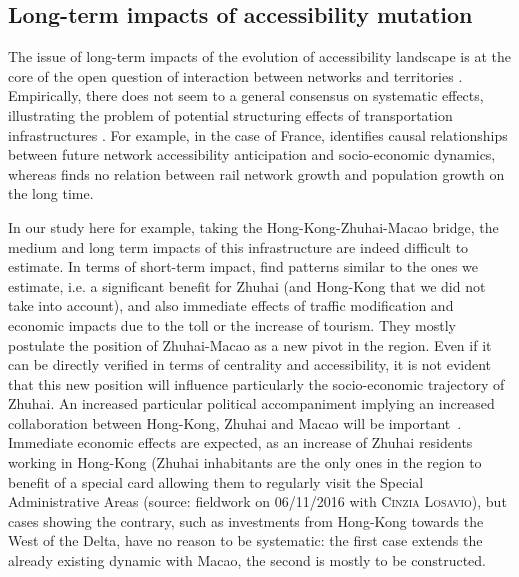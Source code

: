 \documentclass[11pt]{article}
\newcommand{\noun}[1]{\textsc{#1}}
\begin{document}
\subsection{Long-term impacts of accessibility mutation}


The issue of long-term impacts of the evolution of accessibility landscape is at the core of the open question of interaction between networks and territories \citep{raimbault2018caracterisation}. Empirically, there does not seem to a general consensus on systematic effects, illustrating the problem of potential structuring effects of transportation infrastructures \citep{bonnafous1974methodologies}. For example, in the case of France, \cite{raimbault2017identification} identifies causal relationships between future network accessibility anticipation and socio-economic dynamics, whereas \cite{raimbault2018modeling} finds no relation between rail network growth and population growth on the long time.

In our study here for example, taking the Hong-Kong-Zhuhai-Macao bridge, the medium and long term impacts of this infrastructure are indeed difficult to estimate. In terms of short-term impact, \cite{wu2012impact} find patterns similar to the ones we estimate, i.e. a significant benefit for Zhuhai (and Hong-Kong that we did not take into account), and also immediate effects of traffic modification and economic impacts due to the toll or the increase of tourism. They mostly postulate the position of Zhuhai-Macao as a new pivot in the region. Even if it can be directly verified in terms of centrality and accessibility, it is not evident that this new position will influence particularly the socio-economic trajectory of Zhuhai. An increased particular political accompaniment implying an increased collaboration between Hong-Kong, Zhuhai and Macao will be important~\citep{zhou2016medium}. Immediate economic effects are expected, as an increase of Zhuhai residents working in Hong-Kong (Zhuhai inhabitants are the only ones in the region to benefit of a special card allowing them to regularly visit the Special Administrative Areas (source: fieldwork on 06/11/2016 with \noun{Cinzia Losavio}), but cases showing the contrary, such as investments from Hong-Kong towards the West of the Delta, have no reason to be systematic: the first case extends the already existing dynamic with Macao, the second is mostly to be constructed.


\end{document}
